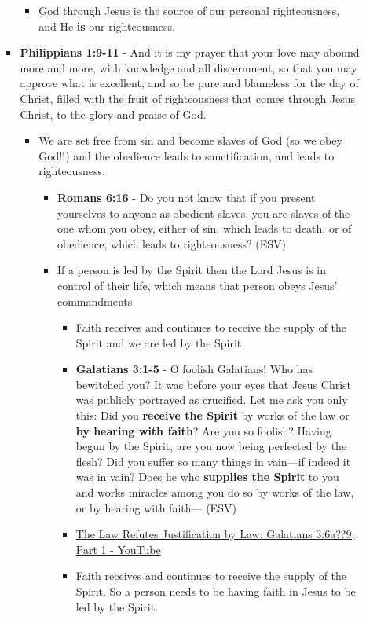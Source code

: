 \documentclass[11pt]{article}
\begin{document}
\begin{itemize}
\begin{itemize}
\begin{itemize}
\begin{itemize}
\item God through Jesus is the source of our personal righteousness, and He \textbf{is} our righteousness.
\end{itemize}
\item \textbf{Philippians 1:9-11} - And it is my prayer that your love may abound more and more, with knowledge and all discernment, so that you may approve what is excellent, and so be pure and blameless for the day of Christ, filled with the fruit of righteousness that comes through Jesus Christ, to the glory and praise of God.
\begin{itemize}
\item We are set free from sin and become slaves of God (so we obey God!!) and the obedience leads to sanctification, and leads to righteousness.
\begin{itemize}
\item \textbf{Romans 6:16} - Do you not know that if you present yourselves to anyone as obedient slaves, you are slaves of the one whom you obey, either of sin, which leads to death, or of obedience, which leads to righteousness? (ESV)
\item If a person is led by the Spirit then the Lord Jesus is in control of their life, which means that person obeys Jesus' commandments
\begin{itemize}
\item Faith receives and continues to receive the supply of the Spirit and we are led by the Spirit.
\item \textbf{Galatians 3:1-5} - O foolish Galatians! Who has bewitched you? It was before your eyes that Jesus Christ was publicly portrayed as crucified. Let me ask you only this: Did you \textbf{receive the Spirit} by works of the law or \textbf{by hearing with faith}? Are you so foolish? Having begun by the Spirit, are you now being perfected by the flesh? Did you suffer so many things in vain—if indeed it was in vain? Does he who \textbf{supplies the Spirit} to you and works miracles among you do so by works of the law, or by hearing with faith— (ESV)
\item \href{https://www.youtube.com/watch?v=34pBf5pZq\_I}{The Law Refutes Justification by Law: Galatians 3:6a??9, Part 1 - YouTube}
\item Faith receives and continues to receive the supply of the Spirit. So a person needs to be having faith in Jesus to be led by the Spirit.
\end{itemize}
\end{itemize}

\end{itemize}
\end{itemize}
\end{itemize}
\end{itemize}
\end{document}
